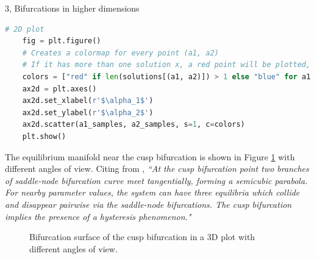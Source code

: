 \documentclass[10pt,a4paper]{article}
\begin{document}
\begin{task}{3, Bifurcations in higher dimensions}
\begin{lstlisting}[language = Python, caption = {Method for visualizing the cusp bifurcation in a 3D and 2D plot.}, label = {cusp_method}]
    # 2D plot
    fig = plt.figure()
    # Creates a colormap for every point (a1, a2)
    # If it has more than one solution x, a red point will be plotted, blue otherwise
    colors = ["red" if len(solutions[(a1, a2)]) > 1 else "blue" for a1, a2 in zip(a1_samples, a2_samples)]
    ax2d = plt.axes()
    ax2d.set_xlabel(r'$\alpha_1$')
    ax2d.set_ylabel(r'$\alpha_2$')
    ax2d.scatter(a1_samples, a2_samples, s=1, c=colors)
    plt.show()
\end{lstlisting}

\newpage

The equilibrium manifold near the cusp bifurcation is shown in Figure \ref{3dcusp} with different angles of view. Citing from \cite{Cusp}, \emph{``At the cusp bifurcation point two branches of saddle-node bifurcation curve meet tangentially, forming a semicubic parabola. For nearby parameter values, the system can have three equilibria which collide and disappear pairwise via the saddle-node bifurcations. The cusp bifurcation implies the presence of a hysteresis phenomenon."}

\begin{figure} [H]
    \centering
    \caption{Bifurcation surface of the cusp bifurcation in a 3D plot with different angles of view.}
    \label{3dcusp}
\end{figure}


\end{task}
\end{document}
